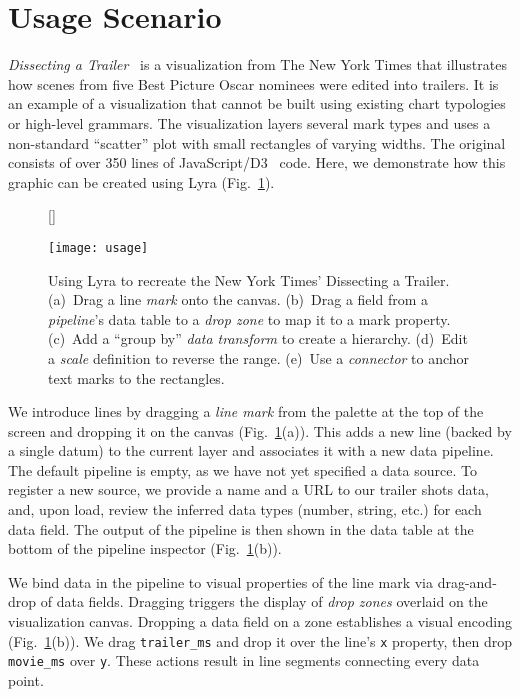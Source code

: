 \section{Usage Scenario}

\emph{Dissecting a Trailer}~\cite{nytimes:trailer} is a visualization from The
New York Times that illustrates how scenes from five Best Picture Oscar nominees
were edited into trailers. It is an example of a visualization that cannot be
built using existing chart typologies or high-level grammars. The visualization
layers several mark types and uses a non-standard ``scatter'' plot with small
rectangles of varying widths. The original consists of over 350 lines of
JavaScript/D3~\cite{bostock:d3} code. Here, we demonstrate how this graphic can
be created using Lyra (Fig.~\ref{fig:lyra:usage}).

\begin{figure}[h!]
[\FBwidth]
{\caption{Using Lyra to recreate the New York Times' Dissecting a Trailer.
(a)~Drag a line \emph{mark} onto the canvas. (b)~Drag a field from a
\emph{pipeline}'s data table to a \emph{drop zone} to map it to a mark property.
(c)~Add a ``group by'' \emph{data transform} to create a hierarchy. (d)~Edit a
\emph{scale} definition to reverse the range. (e)~Use a \emph{connector} to
anchor text marks to the rectangles.}
\label{fig:lyra:usage}}
{\texttt{[image: usage]}}
\end{figure}

We introduce lines by dragging a \emph{line mark} from the palette at the top of
the screen and dropping it on the canvas (Fig.~\ref{fig:lyra:usage}(a)). This
adds a new line (backed by a single datum) to the current layer and associates
it with a new data pipeline. The default pipeline is empty, as we have not yet
specified a data source. To register a new source, we provide a name and a URL
to our trailer shots data, and, upon load, review the inferred data types
(number, string, etc.) for each data field. The output of the pipeline is then
shown in the data table at the bottom of the pipeline inspector
(Fig.~\ref{fig:lyra:usage}(b)).

We bind data in the pipeline to visual properties of the line mark via
drag-and-drop of data fields. Dragging triggers the display of \emph{drop zones}
overlaid on the visualization canvas. Dropping a data field on a zone
establishes a visual encoding (Fig.~\ref{fig:lyra:usage}(b)). We drag
\texttt{trailer\_ms} and drop it over the line's \texttt{x} property, then drop
\texttt{movie\_ms} over \texttt{y}. These actions result in line segments
connecting every data point.

